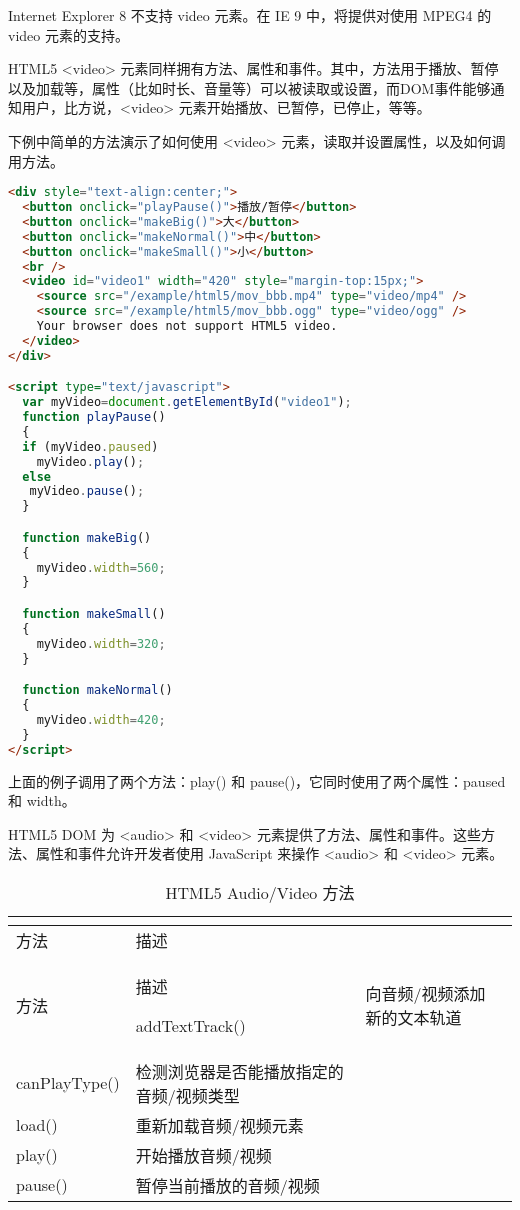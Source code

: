 Internet Explorer 8 不支持 video 元素。在 IE 9 中，将提供对使用 MPEG4 的 video 元素的支持。






HTML5 <video> 元素同样拥有方法、属性和事件。其中，方法用于播放、暂停以及加载等，属性（比如时长、音量等）可以被读取或设置，而DOM事件能够通知用户，比方说，<video> 元素开始播放、已暂停，已停止，等等。

下例中简单的方法演示了如何使用 <video> 元素，读取并设置属性，以及如何调用方法。

\begin{lstlisting}[language=HTML]
<div style="text-align:center;">
  <button onclick="playPause()">播放/暂停</button> 
  <button onclick="makeBig()">大</button>
  <button onclick="makeNormal()">中</button>
  <button onclick="makeSmall()">小</button>
  <br /> 
  <video id="video1" width="420" style="margin-top:15px;">
    <source src="/example/html5/mov_bbb.mp4" type="video/mp4" />
    <source src="/example/html5/mov_bbb.ogg" type="video/ogg" />
    Your browser does not support HTML5 video.
  </video>
</div> 

<script type="text/javascript">
  var myVideo=document.getElementById("video1");
  function playPause()
  { 
  if (myVideo.paused) 
    myVideo.play(); 
  else 
   myVideo.pause(); 
  } 

  function makeBig()
  { 
    myVideo.width=560; 
  } 

  function makeSmall()
  { 
    myVideo.width=320; 
  } 

  function makeNormal()
  { 
    myVideo.width=420; 
  } 
</script> 
\end{lstlisting}

上面的例子调用了两个方法：play() 和 pause()，它同时使用了两个属性：paused 和 width。


HTML5 DOM 为 <audio> 和 <video> 元素提供了方法、属性和事件。这些方法、属性和事件允许开发者使用 JavaScript 来操作 <audio> 和 <video> 元素。



\begin{longtable}{|p{80pt}|p{280pt}|}
\tabularnewline\hline
方法		&描述
\endhead

\caption{HTML5 Audio/Video 方法}\\
\hline
方法		&描述
\endfirsthead

\endfoot

\endlastfoot

\hline
addTextTrack()	&向音频/视频添加新的文本轨道\\
\hline
canPlayType()		&检测浏览器是否能播放指定的音频/视频类型\\
\hline
load()			&重新加载音频/视频元素\\
\hline
play()			&开始播放音频/视频\\
\hline
pause()			&暂停当前播放的音频/视频\\
\hline
\end{longtable}


